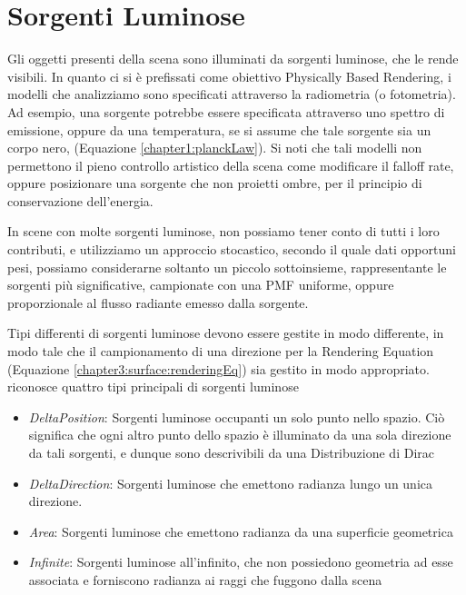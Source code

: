 \section{Sorgenti Luminose}
Gli oggetti presenti della scena sono illuminati da sorgenti luminose, che le rende visibili. In quanto ci si \`e prefissati come obiettivo 
Physically Based Rendering, i modelli che analizziamo sono specificati attraverso la radiometria (o fotometria). Ad esempio, una sorgente potrebbe 
essere specificata attraverso uno spettro di emissione, oppure da una temperatura, se si assume che tale sorgente sia un corpo nero, (Equazione 
\ref{chapter1:planckLaw}). Si noti che tali modelli non permettono il pieno controllo artistico della scena come modificare il falloff rate, oppure 
posizionare una sorgente che non proietti ombre, per il principio di conservazione dell'energia.\par
In scene con molte sorgenti luminose, non possiamo tener conto di tutti i loro contributi, e utilizziamo un approccio stocastico, secondo il quale
dati opportuni pesi, possiamo considerarne soltanto un piccolo sottoinsieme, rappresentante le sorgenti pi\`u significative, campionate con una 
PMF uniforme, oppure proporzionale al flusso radiante emesso dalla sorgente\footnotemark{}.\par
Tipi differenti di sorgenti luminose devono essere gestite in modo differente, in modo tale che il campionamento di una direzione per la 
Rendering Equation (Equazione \ref{chapter3:surface:renderingEq}) sia gestito in modo appropriato. \cite{pharr} riconosce quattro tipi principali 
di sorgenti luminose
\begin{itemize}[topsep=0pt,noitemsep]
	\item \textit{DeltaPosition}: Sorgenti luminose occupanti un solo punto nello spazio. Ci\`o significa che ogni altro punto dello spazio \`e 
		illuminato da una sola direzione da tali sorgenti, e dunque sono descrivibili da una Distribuzione di Dirac
	\item \textit{DeltaDirection}: Sorgenti luminose che emettono radianza lungo un unica direzione\footnotemark{}.
	\item \textit{Area}: Sorgenti luminose che emettono radianza da una superficie geometrica
	\item \textit{Infinite}: Sorgenti luminose all'infinito, che non possiedono geometria ad esse associata e forniscono radianza ai raggi che 
		fuggono dalla scena
\end{itemize}
